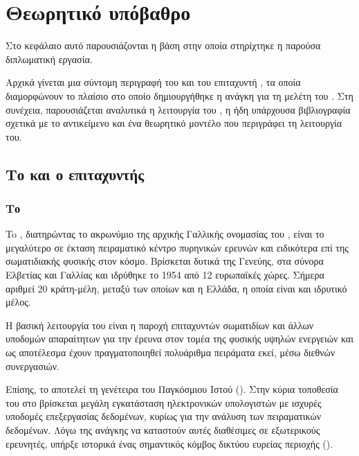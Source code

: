 \chapter{Θεωρητικό υπόβαθρο} \label{ch:theoretical-background}
Στο κεφάλαιο αυτό παρουσιάζονται η βάση στην οποία στηρίχτηκε η παρούσα διπλωματική εργασία.

Αρχικά γίνεται μια σύντομη περιγραφή του  και του επιταχυντή , τα οποία διαμορφώνουν το πλαίσιο στο οποίο δημιουργήθηκε η ανάγκη για τη μελέτη του . 
Στη συνέχεια, παρουσιάζεται αναλυτικά η λειτουργία του , η ήδη υπάρχουσα βιβλιογραφία σχετικά με το αντικείμενο και ένα θεωρητικό μοντέλο που περιγράφει τη λειτουργία του. 


\section{Το  και ο επιταχυντής }



\subsection{Το }

To , διατηρώντας το ακρωνύμιο της αρχικής Γαλλικής ονομασίας του , είναι το μεγαλύτερο σε έκταση πειραματικό κέντρο πυρηνικών ερευνών και ειδικότερα επί της σωματιδιακής φυσικής στον κόσμο. 
Βρίσκεται δυτικά της Γενεύης, στα σύνορα Ελβετίας και Γαλλίας και ιδρύθηκε το 1954 από 12 ευρωπαϊκές χώρες. 
Σήμερα αριθμεί 20 κράτη-μέλη, μεταξύ των οποίων και η Ελλάδα, η οποία είναι και ιδρυτικό μέλος.


Η βασική λειτουργία του  είναι η παροχή επιταχυντών σωματιδίων και άλλων υποδομών απαραίτητων για την έρευνα στον τομέα της φυσικής υψηλών ενεργειών και ως αποτέλεσμα έχουν πραγματοποιηθεί πολυάριθμα πειράματα εκεί, μέσω διεθνών συνεργασιών.

Επίσης, το  αποτελεί τη γενέτειρα του Παγκόσμιου Ιστού ().
Στην κύρια τοποθεσία του στο  βρίσκεται μεγάλη εγκατάσταση ηλεκτρονικών υπολογιστών με ισχυρές υποδομές επεξεργασίας δεδομένων, κυρίως για την ανάλυση των πειραματικών δεδομένων. 
Λόγω της ανάγκης να καταστούν αυτές διαθέσιμες σε εξωτερικούς ερευνητές, υπήρξε ιστορικά ένας σημαντικός κόμβος δικτύου ευρείας περιοχής ().

